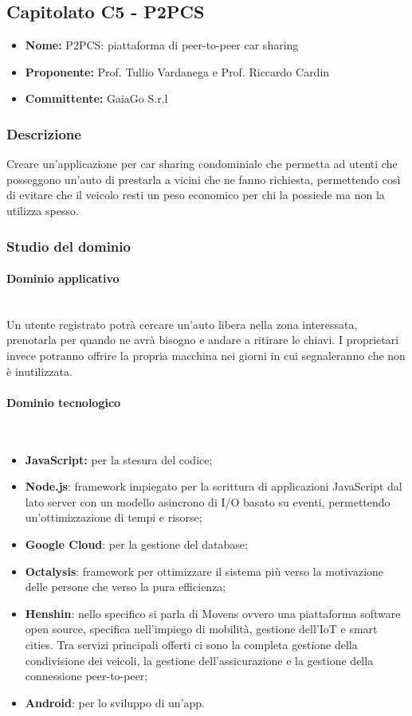 \subsection{Capitolato C5 - P2PCS}
\begin{itemize}
	\item \textbf{Nome:} P2PCS: piattaforma di peer-to-peer car sharing
	\item \textbf{Proponente:} Prof. Tullio Vardanega e Prof. Riccardo Cardin
	\item \textbf{Committente:} GaiaGo S.r.l
\end{itemize}
\subsubsection{Descrizione}
Creare un'applicazione per car sharing condominiale che permetta ad utenti che posseggono un'auto di prestarla a vicini che ne fanno richiesta, permettendo così di evitare che il veicolo resti un peso economico per chi la possiede ma non la utilizza spesso. 
\subsubsection{Studio del dominio}
\paragraph{Dominio applicativo}\mbox{}\\
Un utente registrato potrà cercare un'auto libera nella zona interessata, prenotarla per quando ne avrà bisogno e andare a ritirare le chiavi. I proprietari invece potranno offrire la propria macchina nei giorni in cui segnaleranno che non è inutilizzata.
\paragraph{Dominio tecnologico}\mbox{}\\
\begin{itemize}
    \item \textbf{JavaScript:} per la stesura del codice;
	\item \textbf{Node.js}: framework impiegato per la scrittura di applicazioni JavaScript dal lato server con un modello asincrono di I/O basato su eventi, permettendo un'ottimizzazione di tempi e risorse;
	\item \textbf{Google Cloud}: per la gestione del database;
	\item \textbf{Octalysis}: framework per ottimizzare il sistema più verso la motivazione delle persone che verso la pura efficienza;
	\item \textbf{Henshin}: nello specifico si parla di Movens ovvero una piattaforma software open source, specifica nell'impiego di mobilità, gestione dell'IoT e smart cities. Tra servizi principali offerti ci sono la completa gestione della condivisione dei veicoli, la gestione dell'assicurazione e la gestione della connessione peer-to-peer;
	\item \textbf{Android}: per lo sviluppo di un'app.
\end{itemize}
